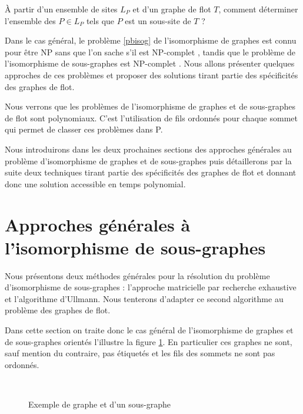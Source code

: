 
\begin{pb}\label{pbisosgbase}
 À partir d'un ensemble de sites $L_P$ et d'un graphe de flot $T$, comment déterminer l'ensemble des $P\in L_P$ tels que $P$ est un sous-site de $T$ ?
\end{pb}

Dans le cas général, le problème \ref{pbisog} de l'isomorphisme de graphes est connu pour être NP sans que l'on sache s'il est NP-complet \cite{Kob94}, tandis que le problème de l'isomorphisme de sous-graphes est NP-complet \cite{W05}.
Nous allons présenter quelques approches de ces problèmes et proposer des solutions tirant partie des spécificités des graphes de flot.

Nous verrons que les problèmes de l'isomorphisme de graphes et de sous-graphes de flot sont polynomiaux.
C'est l'utilisation de fils ordonnés pour chaque sommet qui permet de classer ces problèmes dans P.

Nous introduirons dans les deux prochaines sections des approches générales au problème d'isomorphisme de graphes et de sous-graphes puis détaillerons par la suite deux techniques tirant partie des spécificités des graphes de flot et donnant donc une solution accessible en temps polynomial.

\section{Approches générales à l'isomorphisme de sous-graphes}
Nous présentons deux méthodes générales pour la résolution du problème d'isomorphisme de sous-graphes : l'approche matricielle par recherche exhaustive et l'algorithme d'Ullmann. Nous tenterons d'adapter ce second algorithme au problème des graphes de flot.

Dans cette section on traite donc le cas général de l'isomorphisme de graphes et de sous-graphes orientés l'illustre la figure \ref{fig:ex-graphe-sg}. En particulier ces graphes ne sont, sauf mention du contraire, pas étiquetés et les fils des sommets ne sont pas ordonnés.

\begin{figure}[h]
\begin{center}
  \subfigure[Graphe T]{
\label{fig:ex-graphe}
\texttt{[image: supports/algos/gT\_circo\_cropped0.pdf]}
}\quad
  \subfigure[Graphe P, isomorphe à un sous-graphe de T]{
\label{fig:ex-sg}
\texttt{[image: supports/algos/gP\_circo\_cropped0.pdf]}
}\\
\end{center}
\caption{Exemple de graphe et d'un sous-graphe}
\label{fig:ex-graphe-sg}
\end{figure}

